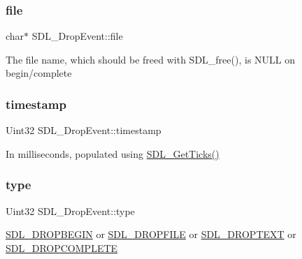 \subsubsection{\texorpdfstring{file}{file}}
{\footnotesize\ttfamily char$\ast$ S\+D\+L\+\_\+\+Drop\+Event\+::file}

The file name, which should be freed with S\+D\+L\+\_\+free(), is N\+U\+LL on begin/complete \mbox{\label{structSDL__DropEvent_a02d2c81bb22db632a40cd0021ff751ab}} 
\subsubsection{\texorpdfstring{timestamp}{timestamp}}
{\footnotesize\ttfamily Uint32 S\+D\+L\+\_\+\+Drop\+Event\+::timestamp}

In milliseconds, populated using \hyperlink{SDL__timer_8h_a0b9bc71d6287e0ffafdc3419760fe2b3}{S\+D\+L\+\_\+\+Get\+Ticks()} \mbox{\label{structSDL__DropEvent_a5ea27cfaa5f8d4940e9a69b68b3cc035}} 
\subsubsection{\texorpdfstring{type}{type}}
{\footnotesize\ttfamily Uint32 S\+D\+L\+\_\+\+Drop\+Event\+::type}

\hyperlink{SDL__events_8h_a3b589e89be6b35c02e0dd34a55f3fccaa0809886c132aaf734fff6f2abf466912}{S\+D\+L\+\_\+\+D\+R\+O\+P\+B\+E\+G\+IN} or \hyperlink{SDL__events_8h_a3b589e89be6b35c02e0dd34a55f3fccaad9238862d7aeaebff88be6453ee0fbab}{S\+D\+L\+\_\+\+D\+R\+O\+P\+F\+I\+LE} or \hyperlink{SDL__events_8h_a3b589e89be6b35c02e0dd34a55f3fccaa1d97f901333e40b0ccc4dff1a319213f}{S\+D\+L\+\_\+\+D\+R\+O\+P\+T\+E\+XT} or \hyperlink{SDL__events_8h_a3b589e89be6b35c02e0dd34a55f3fccaaa83e80a89d5c4ff14889d07dddc402ef}{S\+D\+L\+\_\+\+D\+R\+O\+P\+C\+O\+M\+P\+L\+E\+TE} \mbox{\label{structSDL__DropEvent_a8cecd2178cdc04118bf852e7cf7bf647}} 
